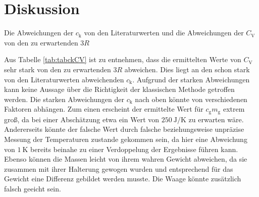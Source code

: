 
\section{Diskussion}
\label{sec:Diskussion}

\begin{table}
	\centering
	\caption{Die Abweichungen der $c_\text{k}$ von den Literaturwerten \cite{clit} und die Abweichungen der $C_\text{V}$ von den zu erwartenden $3R$}
	
	\label{tab:tabckCV}
\end{table}
\noindent Aus Tabelle \ref{tab:tabckCV} ist zu entnehmen, dass die ermittelten Werte von $C_\text{V}$ sehr stark von den zu erwartenden $3R$ abweichen. Dies liegt an den schon stark von den Literaturwerten abweichenden $c_\text{k}$. Aufgrund der starken Abweichungen kann keine Aussage über die Richtigkeit der klassischen Methode getroffen werden. \newline
Die starken Abweichungen der $c_\text{k}$ nach oben könnte von verschiedenen Faktoren abhängen. Zum einen erscheint der ermittelte Wert für $c_\text{g}m_\text{g}$ extrem groß, da bei einer Abschätzung etwa ein Wert von $\SI{250}{\joule\per\kelvin}$ zu erwarten wäre.\newline
Andererseits könnte der falsche Wert durch falsche beziehungsweise unpräzise Messung der Temperaturen zustande gekommen sein, da hier eine Abweichung von $\SI{1}{\kelvin}$ bereits beinahe zu einer Verdoppelung der Ergebnisse führen kann.\newline
Ebenso können die Massen leicht von ihrem wahren Gewicht abweichen, da sie zusammen mit ihrer Halterung gewogen wurden und entsprechend für das Gewicht eine Differenz gebildet werden musste. Die Waage könnte zusätzlich falsch geeicht sein. 



